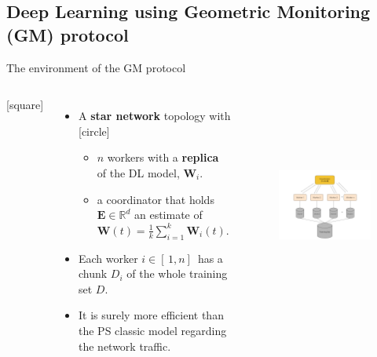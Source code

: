 \subsection{Deep Learning using Geometric Monitoring (GM) protocol}\label{subsec:deep-learning-using-gm-protocol}

\begin{frame}{The environment of the GM protocol}
    \begin{columns}
        [square]
        \begin{itemize}
            \item{A \textbf{star network} topology with
            [circle]
            \begin{itemize}
                \item $n$ workers with a \textbf{replica} of the DL model, $\pmb{W}_i$.
                \item a coordinator that holds $\pmb{E}\in\mathbb{R}^d$ an estimate of $\pmb{W}(t)=\frac{1}{k}\sum_{i=1}^k\pmb{W}_i(t)$.
            \end{itemize}}
            \vspace{0.1cm}
            \item{Each worker $i \in [\,1,n]\,$ has a chunk $D_i$ of the whole training set $D$.}
            \vspace{0.1cm}
            \item{It is surely more efficient than the PS classic model regarding the network traffic.}
        \end{itemize}
        \begin{figure}
            \includegraphics[width=8cm,height=6.5cm,center]{images/ml-fgm.png}\label{fig:ml-gm}
        \end{figure}
    \end{columns}
\end{frame}

